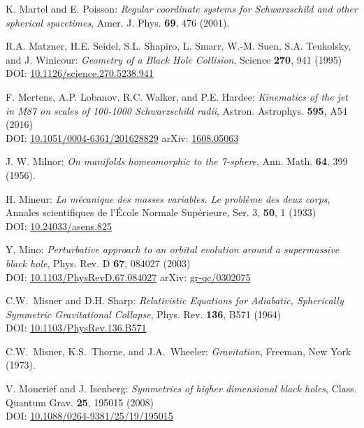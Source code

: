 \begin{thebibliography}{123}
K. Martel and E. Poisson:
\emph{Regular coordinate systems for Schwarzschild and other spherical spacetimes},
Amer. J. Phys. {\bf 69}, 476 (2001).

R.A. Matzner, H.E. Seidel, S.L. Shapiro, L. Smarr, W.-M. Suen, S.A. Teukolsky, and
J. Winicour: {\em Geometry of a Black Hole Collision},
Science {\bf 270}, 941 (1995)\\
DOI: \href{https://doi.org/10.1126/science.270.5238.941}{10.1126/science.270.5238.941}

F. Mertens, A.P. Lobanov, R.C. Walker, and P.E. Hardee:
{\em Kinematics of the jet in M87 on scales of 100-1000 Schwarzschild radii},
Astron. Astrophys. {\bf 595}, A54 (2016)\\
DOI: \href{https://doi.org/10.1051/0004-6361/201628829}{10.1051/0004-6361/201628829}\hfill
arXiv: \href{https://arxiv.org/abs/1608.05063}{1608.05063}

J. W. Milnor: {\em On manifolds homeomorphic to the 7-sphere},
Ann. Math. {\bf 64}, 399 (1956).

H. Mineur: {\em La mécanique des masses variables. Le problème des deux corps},
Annales scientifiques de l'École Normale Supérieure, Ser. 3, {\bf 50}, 1 (1933)\\
DOI: \href{https://doi.org/10.24033/asens.825}{10.24033/asens.825}

Y. Mino:
{\em Perturbative approach to an orbital evolution around a supermassive black hole},
Phys. Rev. D {\bf 67}, 084027 (2003)\\
DOI: \href{https://doi.org/10.1103/PhysRevD.67.084027}{10.1103/PhysRevD.67.084027}\hfill
arXiv: \href{https://arxiv.org/abs/gr-qc/0302075}{gr-qc/0302075}

C.W.~Misner and D.H. Sharp:
{\em Relativistic Equations for Adiabatic, Spherically Symmetric Gravitational Collapse},
Phys. Rev. {\bf 136}, B571 (1964)\\
DOI: \href{https://doi.org/10.1103/PhysRev.136.B571}{10.1103/PhysRev.136.B571}

C.W.~Misner, K.S.~Thorne, and J.A.~Wheeler: {\em Gravitation},
Freeman, New York (1973).

V. Moncrief and J. Isenberg:
{\em Symmetries of higher dimensional black holes},
Class. Quantum Grav. {\bf 25}, 195015 (2008)\\
DOI: \href{https://doi.org/10.1088/0264-9381/25/19/195015}{10.1088/0264-9381/25/19/195015}


\end{thebibliography}
